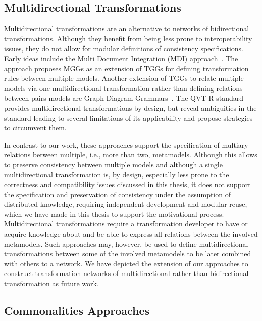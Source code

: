 \subsection{Multidirectional Transformations}

Multidirectional transformations are an alternative to networks of bidirectional transformations.
Although they benefit from being less prone to interoperability issues, they do not allow for modular definitions of consistency specifications.
Early ideas include the Multi Document Integration (MDI) approach~\cite{koenigs2006MGGs-SoSym}. The approach proposes \glspl{MGG} as an extension of \glspl{TGG} for defining transformation rules between multiple models.
Another extension of \glspl{TGG} to relate multiple models via one multidirectional transformation rather than defining relations between pairs models are Graph Diagram Grammars~\cite{trollmann2015TransformationTGGtoMultiModel-ICMT, trollmann2016SynchronizationTGGtoMultiModel-ICMT}.
The QVT-R standard~\cite{qvt} provides multidirectional transformations by design, but \textcite{macedo2014FrameworkMultiDirectional-BX} reveal ambiguities in the standard leading to several limitations of its applicability  and propose strategies to circumvent them.

In contrast to our work, these approaches support the specification of multiary relations between multiple, i.e., more than two, metamodels.
Although this allows to preserve consistency between multiple models and although a single multidirectional transformation is, by design, especially less prone to the correctness and compatibility issues discussed in this thesis, it does not support the specification and preservation of consistency under the assumption of distributed knowledge, requiring independent development and modular reuse, which we have made in this thesis to support the motivational process.
Multidirectional transformations require a transformation developer to have or acquire knowledge about and be able to express all relations between the involved metamodels.
Such approaches may, however, be used to define multidirectional transformations between some of the involved metamodels to be later combined with others to a network.
We have depicted the extension of our approaches to construct transformation networks of multidirectional rather than bidirectional transformation as future work.


\subsection{Commonalities Approaches}


